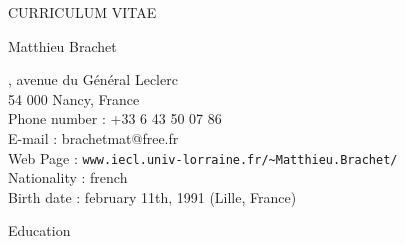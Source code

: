 \documentclass[10pt,a4paper]{report}
\begin{document}
\begin{center}
{\selectfont
\begin{LARGE}
CURRICULUM VITAE
\end{LARGE}

\begin{large}
Matthieu Brachet
\end{large}

\hrulefill
}
\end{center}

, avenue du Général Leclerc\\
54 000 Nancy, France
\vspace{0.2cm}\\
Phone number : +33 6 43 50 07 86\\
E-mail : brachetmat@free.fr\\
Web Page : \verb?www.iecl.univ-lorraine.fr/~Matthieu.Brachet/?
\vspace{0.2cm}\\
Nationality : french\\
Birth date : february 11th, 1991 (Lille, France)


\vspace{.5cm}
\noindent
{\selectfont
\begin{Large}
Education
\end{Large}
\hrulefill
}
\end{document}
